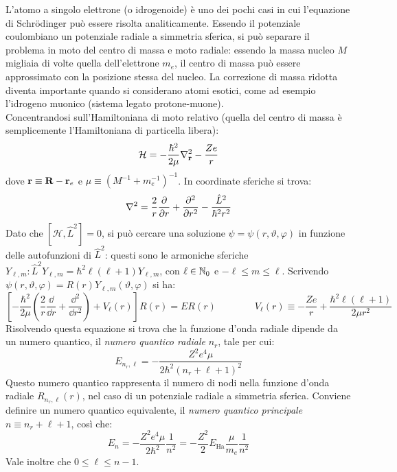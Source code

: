 L'atomo a singolo elettrone (o idrogenoide) è uno dei pochi casi in cui l'equazione di Schrödinger può essere risolta analiticamente. Essendo il potenziale coulombiano un potenziale radiale a simmetria sferica, si può separare il problema in moto del centro di massa e moto radiale: essendo la massa nucleo $ M $ migliaia di volte quella dell'elettrone $ m_e $, il centro di massa può essere approssimato con la posizione stessa del nucleo. La correzione di massa ridotta diventa importante quando si considerano atomi esotici, come ad esempio l'idrogeno muonico (sistema legato protone-muone).\\
Concentrandosi sull'Hamiltoniana di moto relativo (quella del centro di massa è semplicemente l'Hamiltoniana di particella libera):
\begin{equation}
	\mathcal{H} = - \frac{\hbar^2}{2\mu} \nabla_{\mathbf{r}}^2 - \frac{Ze}{r}
	\label{eq:1-e-ham}
\end{equation}
dove $ \mathbf{r} \equiv \mathbf{R} - \mathbf{r}_e $ e $ \mu \equiv (M^{-1} + m_e^{-1})^{-1} $. In coordinate sferiche si trova:
\begin{equation*}
	\nabla^2 = \frac{2}{r} \frac{\partial}{\partial r} + \frac{\partial^2}{\partial r^2} - \frac{\hat{L}^2}{\hbar^2 r^2}
\end{equation*}
Dato che $ [\mathcal{H} , \hat{L}^2] = 0 $, si può cercare una soluzione $ \psi = \psi(r,\vartheta,\varphi) $ in funzione delle autofunzioni di $ \hat{L}^2 $: questi sono le armoniche sferiche $ Y_{\ell,m} : \hat{L}^2 Y_{\ell,m} = \hbar^2 \ell (\ell + 1) Y_{\ell,m} $, con $ \ell \in \mathbb{N}_0 $ e $ -\ell \le m \le \ell $. Scrivendo $ \psi(r,\vartheta,\varphi) = R(r) Y_{\ell,m}(\vartheta,\varphi) $ si ha:
\begin{equation*}
	\left[ - \frac{\hbar^2}{2\mu} \left( \frac{2}{r} \frac{\dd}{\dd r} + \frac{\dd^2}{\dd r^2} \right) + V_\ell(r) \right] R(r) = E R(r)
	\qquad \qquad
	V_\ell(r) \equiv - \frac{Ze}{r} + \frac{\hbar^2 \ell(\ell + 1)}{2\mu r^2}
\end{equation*}
Risolvendo questa equazione si trova che la funzione d'onda radiale dipende da un numero quantico, il \textit{numero quantico radiale} $ n_r $, tale per cui:
\begin{equation*}
	E_{n_r,\ell} = - \frac{Z^2 e^4 \mu}{2\hbar^2 (n_r + \ell + 1)^2}
\end{equation*}
Questo numero quantico rappresenta il numero di nodi nella funzione d'onda radiale $ R_{n_r,\ell}(r) $, nel caso di un potenziale radiale a simmetria sferica. Conviene definire un numero quantico equivalente, il \textit{numero quantico principale} $ n \equiv n_r + \ell + 1 $, così che:
\begin{equation}
	E_n = - \frac{Z^2 e^4 \mu}{2\hbar^2} \frac{1}{n^2} = - \frac{Z^2}{2} E_\text{Ha} \frac{\mu}{m_e} \frac{1}{n^2}
	\label{eq:1-e-en}
\end{equation}
Vale inoltre che $ 0 \le \ell \le n-1 $.

